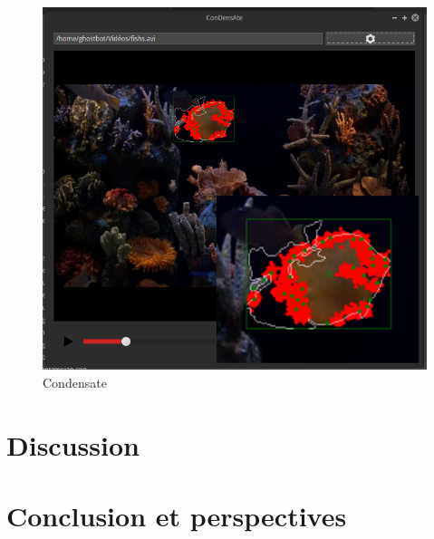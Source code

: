 \documentclass[a4paper,12pt]{report}
\begin{document}
\begin{figure}[hbtp]
\centering
\includegraphics[scale=0.5]{screenshots/condensate24.png}
\caption{Condensate}
\end{figure}


\chapter{Discussion}


\chapter{Conclusion et perspectives}






\nocite{*}

\listoffigures
\end{document}
